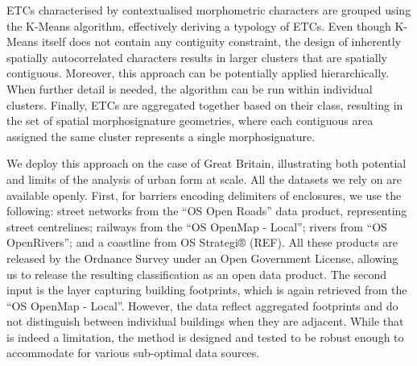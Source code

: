 ETCs characterised by contextualised morphometric characters are grouped using
the K-Means algorithm, effectively deriving a typology of ETCs. Even though K-Means itself does not
contain any contiguity constraint, the design of inherently spatially autocorrelated
characters results in larger clusters that are spatially contiguous. Moreover,
this approach can be potentially applied hierarchically. When further detail
is needed, the algorithm can be run within individual
clusters. Finally, ETCs are
aggregated together based on their class, resulting in the set of spatial
morphosignature geometries, where
each contiguous area assigned the same cluster represents a single morphosignature.

We deploy this approach on the case of Great Britain, illustrating both
potential and limits of the analysis of urban form at scale.
All the datasets we rely on are available openly. First, for
barriers encoding delimiters of enclosures,  we use the following: street
networks from the ``OS Open Roads'' data product,
representing street centrelines; railways from the ``OS
OpenMap - Local''; rivers from ``OS OpenRivers''; and a coastline from OS
Strategi® (REF). All these products are released by the Ordnance Survey under
an Open Government License, allowing us to release the
resulting classification as an open data product. The second input is the layer capturing
building footprints, which is again retrieved from the ``OS OpenMap - Local''. However, the
data reflect aggregated footprints and do not distinguish between individual buildings
when they are adjacent. While that is indeed a limitation, the method is designed and
tested \citep{dab_mf_2021} to be robust enough to accommodate for various
sub-optimal data sources.
